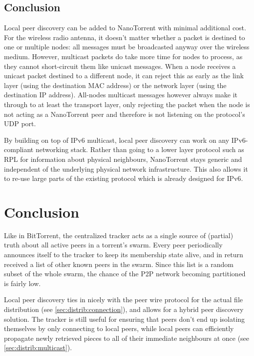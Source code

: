 \subsection{Conclusion}
Local peer discovery can be added to NanoTorrent with minimal additional cost. For the wireless radio antenna, it doesn't matter whether a packet is destined to one or multiple nodes: all messages must be broadcasted anyway over the wireless medium. However, multicast packets do take more time for nodes to process, as they cannot short-circuit them like unicast messages. When a node receives a unicast packet destined to a different node, it can reject this as early as the link layer (using the destination \gls{MAC} address) or the network layer (using the destination \gls{IP} address). All-nodes multicast messages however always make it through to at least the transport layer, only rejecting the packet when the node is not acting as a NanoTorrent peer and therefore is not listening on the protocol's \gls{UDP} port.

By building on top of \gls{IPv6} multicast, local peer discovery can work on any \gls{IPv6}-compliant networking stack. Rather than going to a lower layer protocol such as \gls{RPL} \cite{rfc6550} for information about physical neighbours, NanoTorrent stays generic and independent of the underlying physical network infrastructure. This also allows it to re-use large parts of the existing protocol which is already designed for \gls{IPv6}.

\section{Conclusion}
\label{sec:discovery:conclusion}
Like in BitTorrent, the centralized tracker acts as a single source of (partial) truth about all active peers in a torrent's swarm. Every peer periodically announces itself to the tracker to keep its membership state alive, and in return received a list of other known peers in the swarm. Since this list is a random subset of the whole swarm, the chance of the \gls{P2P} network becoming partitioned is fairly low.

Local peer discovery ties in nicely with the peer wire protocol for the actual file distribution (see \ref{sec:distrib:connection}), and allows for a hybrid peer discovery solution. The tracker is still useful for ensuring that peers don't end up isolating themselves by only connecting to local peers, while local peers can efficiently propagate newly retrieved pieces to all of their immediate neighbours at once (see \ref{sec:distrib:multicast}).

